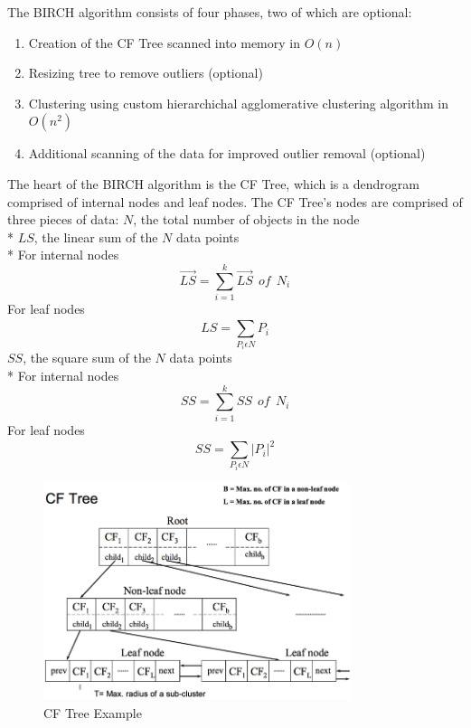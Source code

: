 \documentclass[conference, 10pt]{IEEEtran}
\begin{document}
  The BIRCH algorithm consists of four phases, two of which are optional:
  \vspace{1 mm}
  \begin{enumerate}
    \item Creation of the CF Tree scanned into memory in $O(n)$
    \item Resizing tree to remove outliers (optional)
    \item Clustering using custom hierarchichal agglomerative clustering algorithm in $O(n^2)$
    \item Additional scanning of the data for improved outlier removal (optional)
  \end{enumerate}
  \vspace{1 mm}

  The heart of the BIRCH algorithm is the CF Tree, which is a dendrogram comprised of internal nodes and leaf nodes. The CF Tree's nodes are comprised of three pieces of data:\vspace{1 mm}
  $N$, the total number of objects in the node\\*
  $LS$, the linear sum of the $N$ data points\\*
  For internal nodes
  \begin{equation}
  \overrightarrow{LS} = \sum_{i=1}^{k}\overrightarrow{LS}\:\:of\:\:N_i
  \end{equation}
  For leaf nodes
  \begin{equation}
  LS = \sum_{P_i\epsilon N}^{ }P_i
  \end{equation}
  $SS$, the square sum of the $N$ data points\\*
  For internal nodes
  \begin{equation}
  SS = \sum_{i=1}^{k}SS\:\:of\:\:N_i
  \end{equation}
  For leaf nodes
  \begin{equation}
  SS = \sum_{P_i\epsilon N}^{ }\left | P_i\right |^2
  \end{equation}

  \begin{figure}[!hb]
      \centering
      \includegraphics[width=90mm]{cf_tree.png}
      \caption{CF Tree Example}
  \end{figure}
\end{document}
